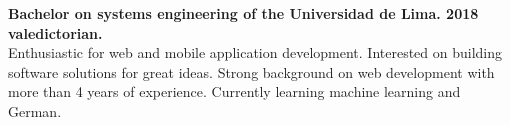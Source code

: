 

\begin{cvparagraph}

{\bfseries Bachelor on systems engineering of the Universidad de Lima. 2018 valedictorian.}\\
Enthusiastic for web and mobile application development. Interested on building software solutions for great ideas. Strong background on web development with more than 4 years of experience. Currently learning machine learning and German. 
\end{cvparagraph}
